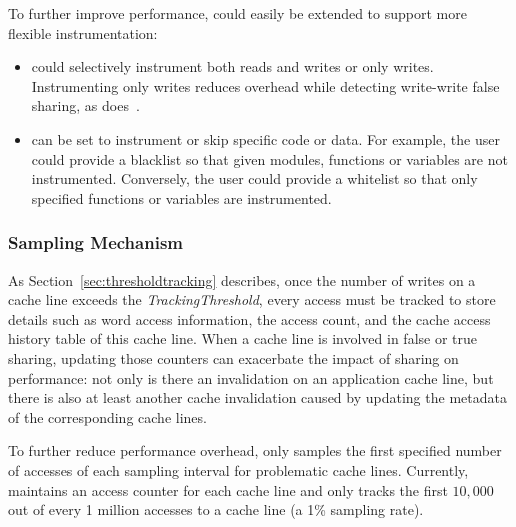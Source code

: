 To further improve performance,
\Predator{} could easily be extended to support more flexible instrumentation:
\begin{itemize}
\item
\Predator{} could selectively instrument both reads and writes or only writes.
Instrumenting only writes reduces overhead while detecting write-write false sharing, 
as \Sheriff{} does~\cite{sheriff}.
\item
\Predator{} can be set to instrument or skip specific code or data. 
For example, the user could provide a blacklist so that given modules,
functions or variables are not instrumented. 
Conversely, the user could provide a whitelist so that only specified functions or variables are instrumented. 
\end{itemize}

\subsubsection{Sampling Mechanism}
\label{sec:sample}
As Section~\ref{sec:thresholdtracking} describes, once the number of
writes on a cache line exceeds the {\it TrackingThreshold}, every
access must be tracked to store details such as word access
information, the access count, and the cache access history table
of this cache line.  When a cache line is involved in false or true
sharing, updating those counters can exacerbate the impact of sharing
on performance: not only is there an invalidation on an application
cache line, but there is also at least another cache invalidation
caused by updating the metadata of the corresponding cache lines.

To further reduce performance overhead, \Predator{} only samples the first specified
number of accesses of each sampling interval for problematic cache lines. 
Currently, \Predator{} maintains an access counter for each cache line
and only tracks the first $10,000$ out of every 1 million
accesses to a cache line (a 1\% sampling rate).

